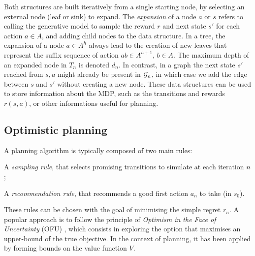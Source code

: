Both structures are built iteratively from a single starting node, by selecting an external node (leaf or sink) to expand. The \emph{expansion} of a node $a$ or $s$ refers to calling the generative model to sample the reward $r$ and next state $s'$ for each action $a\in A$, and adding child nodes to the data structure. In a tree, the expansion of a node $a\in A^h$ always lead to the creation of new leaves that represent the suffix sequence of action $ab\in A^{h+1},\, b\in A$. The maximum depth of an expanded node in $T_n$ is denoted $d_n$. In contrast, in a graph the next state $s'$ reached from $s,a$ might already be present in $\mathcal{G}_n$, in which case we add the edge between $s$ and $s'$ without creating a new node.
These data structures can be used to store information about the MDP, such as the transitions and rewards $r(s, a)$, or other informations useful for planning.


\subsection{Optimistic planning}

A planning algorithm is typically composed of two main rules:
\begin{enumerate*}[label=(\roman*)]
	\item A \emph{sampling rule}, that selects promising transitions to simulate at each iteration $n$;
	\item A \emph{recommendation rule}, that recommends a good first action $a_n$ 	to take (in $s_0$).
\end{enumerate*}
These rules can be chosen with the goal of minimising the simple regret $r_n$.
A popular approach is to follow the principle of \emph{Optimism in the Face of Uncertainty} (OFU) \citep[see][]{Munos14}, which consists in exploring the option that maximises an upper-bound of the true objective. In the context of planning, it has been applied by forming bounds on the value function $V$.

